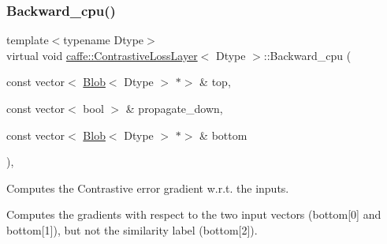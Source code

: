 \subsubsection{\texorpdfstring{Backward\+\_\+cpu()}{Backward\_cpu()}\hspace{0.1cm}{\footnotesize\ttfamily [2/2]}}
{\footnotesize\ttfamily template$<$typename Dtype$>$ \\
virtual void \mbox{\hyperlink{classcaffe_1_1_contrastive_loss_layer}{caffe\+::\+Contrastive\+Loss\+Layer}}$<$ Dtype $>$\+::Backward\+\_\+cpu (\begin{DoxyParamCaption}\item[{const vector$<$ \mbox{\hyperlink{classcaffe_1_1_blob}{Blob}}$<$ Dtype $>$ $\ast$$>$ \&}]{top,  }\item[{const vector$<$ bool $>$ \&}]{propagate\+\_\+down,  }\item[{const vector$<$ \mbox{\hyperlink{classcaffe_1_1_blob}{Blob}}$<$ Dtype $>$ $\ast$$>$ \&}]{bottom }\end{DoxyParamCaption})\hspace{0.3cm}{\ttfamily [protected]}, {\ttfamily [virtual]}}



Computes the Contrastive error gradient w.\+r.\+t. the inputs. 

Computes the gradients with respect to the two input vectors (bottom\mbox{[}0\mbox{]} and bottom\mbox{[}1\mbox{]}), but not the similarity label (bottom\mbox{[}2\mbox{]}).


